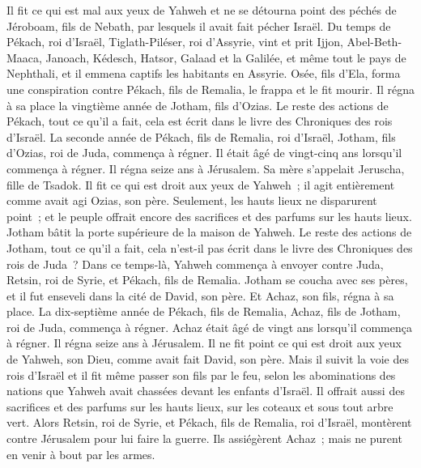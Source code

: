 \begin{multicols}{2}
Il fit ce qui est mal aux yeux de Yahweh et ne se détourna point des péchés de Jéroboam, fils de Nebath, par lesquels il avait fait pécher Israël.
Du temps de Pékach, roi d'Israël, Tiglath-Piléser, roi d'Assyrie, vint et prit Ijjon, Abel-Beth-Maaca, Janoach, Kédesch, Hatsor, Galaad et la Galilée, et même tout le pays de Nephthali, et il emmena captifs les habitants en Assyrie.
Osée, fils d'Ela, forma une conspiration contre Pékach, fils de Remalia, le frappa et le fit mourir. Il régna à sa place la vingtième année de Jotham, fils d'Ozias.
Le reste des actions de Pékach, tout ce qu'il a fait, cela est écrit dans le livre des Chroniques des rois d'Israël.
La seconde année de Pékach, fils de Remalia, roi d'Israël, Jotham, fils d'Ozias, roi de Juda, commença à régner.
Il était âgé de vingt-cinq ans lorsqu'il commença à régner. Il régna seize ans à Jérusalem. Sa mère s'appelait Jeruscha, fille de Tsadok.
Il fit ce qui est droit aux yeux de Yahweh~; il agit entièrement comme avait agi Ozias, son père.
Seulement, les hauts lieux ne disparurent point~; et le peuple offrait encore des sacrifices et des parfums sur les hauts lieux. Jotham bâtit la porte supérieure de la maison de Yahweh.
Le reste des actions de Jotham, tout ce qu'il a fait, cela n'est-il pas écrit dans le livre des Chroniques des rois de Juda~?
Dans ce temps-là, Yahweh commença à envoyer contre Juda, Retsin, roi de Syrie, et Pékach, fils de Remalia.
Jotham se coucha avec ses pères, et il fut enseveli dans la cité de David, son père. Et Achaz, son fils, régna à sa place.
\VerseOne{}La dix-septième année de Pékach, fils de Remalia, Achaz, fils de Jotham, roi de Juda, commença à régner.
Achaz était âgé de vingt ans lorsqu'il commença à régner. Il régna seize ans à Jérusalem. Il ne fit point ce qui est droit aux yeux de Yahweh, son Dieu, comme avait fait David, son père.
Mais il suivit la voie des rois d'Israël et il fit même passer son fils par le feu, selon les abominations des nations que Yahweh avait chassées devant les enfants d'Israël.
Il offrait aussi des sacrifices et des parfums sur les hauts lieux, sur les coteaux et sous tout arbre vert.
Alors Retsin, roi de Syrie, et Pékach, fils de Remalia, roi d'Israël, montèrent contre Jérusalem pour lui faire la guerre. Ils assiégèrent Achaz~; mais ne purent en venir à bout par les armes.

\end{multicols}
